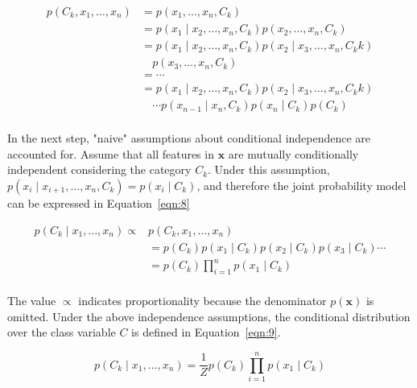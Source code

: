 \documentclass[preprint,12pt]{elsarticle}
\begin{document}
\begin{equation}
	\begin{aligned}
        p(C_{k},x_{1},\ldots,x_{n}) &= p(x_{1},\ldots,x_{n},C_{k}) \\
        &= p(x_{1}\mid x_{2}, \ldots,x_{n},C_{k}) p(x_{2},\ldots,x_{n},C_{k}) \\
        &= p(x_{1}\mid x_{2}, \ldots,x_{n},C_{k}) p(x_{2}\mid x_{3}, \ldots,x_{n},C_{k} {k}) \\
        &\quad p(x_{3},\ldots,x_{n},C_{k}) \\
        &= \cdots \\
        &= p(x_{1}\mid x_{2}, \ldots,x_{n},C_{k}) p(x_{2}\mid x_{3}, \ldots,x_{n},C_{k} {k}) \\
        &\quad \cdots p(x_{n-1}\mid x_{n},C_{k}) p(x_{n}\mid C_{k}) p(C_{k})\\
    \end{aligned}
	\label{eqn:7}
\end{equation}

In the next step, "naive" assumptions about conditional independence are accounted for. Assume that all features in $\mathbf{x}$ are mutually conditionally independent considering the category $C_{k}$. Under this assumption, $p(x_{i}\mid x_{i+1}, \ldots,x_{n},C_{k}) = p(x_{i}\mid C_{k})$, and therefore the joint probability model can be expressed in Equation~\ref{eqn:8}

\begin{equation}
	\begin{aligned}
        p(C_{k}\mid x_{1},\ldots,x_{n}) \propto &p(C_{k}, x_{1},\ldots,x_{n}) \\
        &= p(C_{k})p(x_{1}\mid C_{k}) p(x_{2}\mid C_{k}) p(x_{3}\mid C_{k}) \cdots \\
        &= p(C_{k}) \prod_{i=1}^{n} p(x_{1}\mid C_{k}) \\
    \end{aligned}
	\label{eqn:8}
\end{equation}

The value $\propto$ indicates proportionality because the denominator $p({\mathbf{x}})$ is omitted. Under the above independence assumptions, the conditional distribution over the class variable $C$ is defined in Equation~\ref{eqn:9}.

\begin{equation}
	p(C_{k}\mid x_{1},\ldots,x_{n}) = \frac{1}{Z} p(C_{k}) \prod_{i=1}^{n} p(x_{1}\mid C_{k})
	\label{eqn:9}
\end{equation}
\end{document}

